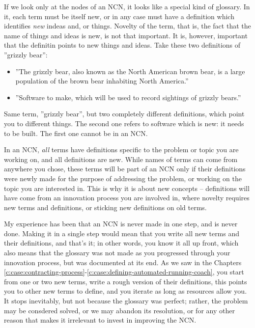 \documentclass[graybox,envcountchap,sectrefs]{svmono}
\newcommand{\ncn}{NCN}
\begin{document}
If we look only at the nodes of an \ncn, it looks like a special kind of glossary. In it, each term must be itself new, or in any case must have a definition which identifies \textit{new} indeas and, or things. Novelty of the term, that is, the fact that the name of things and ideas is new, is not that important. It is, however, important that the definitin points to new things and ideas. Take these two definitions of ''grizzly bear'':
\begin{itemize}
    \item ''The grizzly bear, also known as the North American brown bear, is a large population of the brown bear inhabiting North America.'' \cite{wiki-grizzly-bear}
    \item ''Software to make, which will be used to record sightings of grizzly bears.''
\end{itemize}
Same term, ''grizzly bear'', but two completely different definitions, which point you to different things. The second one refers to software which is new: it needs to be built. The first one cannot be in an \ncn.

In an \ncn, \textit{all} terms have definitions specific to the problem or topic you are working on, and all definitions are new. While names of terms can come from anywhere you chose, these terms will be part of an \ncn{} only if their definitions were newly made for the purpose of addressing the problem, or working on the topic you are interested in. This is why it is about new concepts -- definitions will have come from an innovation process you are involved in, where novelty requires new terms and definitions, or sticking new definitions on old terms. 

My experience has been that an \ncn{} is never made in one step, and is never done. Making it in a single step would mean that you write all new terms and their definitions, and that's it; in other words, you know it all up front, which also means that the glossary was not made as you progressed through your innovation process, but was documented at its end. As we saw in the Chapters \ref{c:case:contracting-process}-\ref{c:case:defining-automated-running-coach}, you start from one or two new terms, write a rough version of their definitions, this points you to other new terms to define, and you iterate as long as resources allow you. It stops inevitably, but not because the glossary was perfect; rather, the problem may be consdered solved, or we may abandon its resolution, or for any other reason that makes it irrelevant to invest in improving the \ncn{}.
\end{document}

